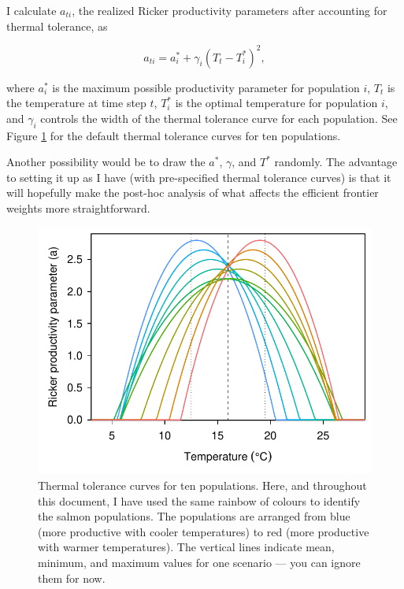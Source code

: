 \documentclass[12pt]{article}
\begin{document}
I calculate $a_{ti}$, the realized Ricker productivity parameters after
accounting for thermal tolerance, as

\begin{equation}
  a_{ti} = a_i^* + \gamma_i (T_t - T_i^*)^2,
\end{equation}

\noindent
where $a_i^*$ is the maximum possible productivity parameter for
population $i$, $T_t$ is the temperature at time step $t$, $T_i^*$ is
the optimal temperature for population $i$, and $\gamma_i$ controls the
width of the thermal tolerance curve for each population. See Figure
\ref{fig:thermal-curves} for the default thermal tolerance curves for
ten populations.

Another possibility would be to draw the $a^*$, $\gamma$, and $T^*$
randomly. The advantage to setting it up as I have (with pre-specified
thermal tolerance curves) is that it will hopefully make the post-hoc
analysis of what affects the efficient frontier weights more
straightforward.

\begin{figure}[htbp]
\centering
\includegraphics{figure/thermal-curves.pdf}
\caption{Thermal tolerance curves for ten populations. Here, and
throughout this document, I have used the same rainbow of colours to
identify the salmon populations. The populations are arranged from blue
(more productive with cooler temperatures) to red (more productive with
warmer temperatures). The vertical lines indicate mean, minimum, and
maximum values for one scenario --- you can ignore them for
now.\label{fig:thermal-curves}}
\end{figure}
\end{document}
